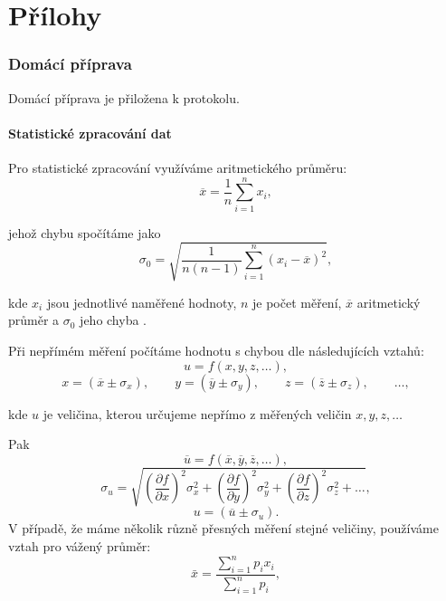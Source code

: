 \documentclass[english]{article}
\begin{document}
\part{Přílohy}

\section{Domácí příprava}
	Domácí příprava je přiložena k protokolu.
\subsection{Statistické zpracování dat}
	Pro statistické zpracování využíváme aritmetického průměru:
	\begin{equation} \label{eq:aritmeticky_prumer}
	\overline{x} = \frac{1}{n}\sum\limits_{i=1}^{n}x_i,
	\end{equation}
	
	jehož chybu spočítáme jako 
	\begin{equation} \label{eq:chyba_aritmetickeho_prumeru}
	\sigma_0 = \sqrt{\frac{1}{n(n-1)} \sum\limits_{i=1}^{n}\left( x_i - \overline{x} \right)^2 },
	\end{equation}
	
	kde $ x_i $ jsou jednotlivé naměřené hodnoty, $ n $ je počet měření, $ \overline{x} $ aritmetický průměr a $ \sigma_0 $ jeho chyba \cite{bib:chyby}.
	
Při nepřímém měření počítáme hodnotu s chybou dle následujících vztahů:
	\begin{equation}
	u = f(x, y, z, \ldots),
	\end{equation}
	\begin{displaymath}
	x = (\overline{x} \pm \sigma_x), \qquad
	y = (\overline{y} \pm \sigma_y), \qquad
	z = (\overline{z} \pm \sigma_z), \qquad
	\ldots,
	\end{displaymath}
	
	kde $ u $ je veličina, kterou určujeme nepřímo z měřených veličin $ x, y, z, \ldots $ 
	
	Pak
	\begin{displaymath}
	\overline{u} = f(\overline{x}, \overline{y}, \overline{z}, \ldots),
	\end{displaymath}
	\begin{equation}\label{eq:chyba_neprime_mereni}
	\sigma_u = \sqrt{\left( \frac{\partial f}{\partial x} \right)^2 \sigma^2_x + \left( \frac{\partial f}{\partial y} \right)^2 \sigma^2_y + \left( \frac{\partial f}{\partial z} \right)^2 \sigma^2_z + \ldots},
	\end{equation}
	\begin{displaymath}
	u = (\overline{u} \pm \sigma_ u).
	\end{displaymath}
%	
V případě, že máme několik různě přesných měření stejné veličiny, používáme vztah pro vážený průměr:
	\begin{equation} 
	\bar{x}=\frac{\sum\limits_{i=1}^{n}p_{i}x_{i}}{\sum\limits_{i=1}^{n}p_{i}},
	\end{equation}
	
\end{document}

